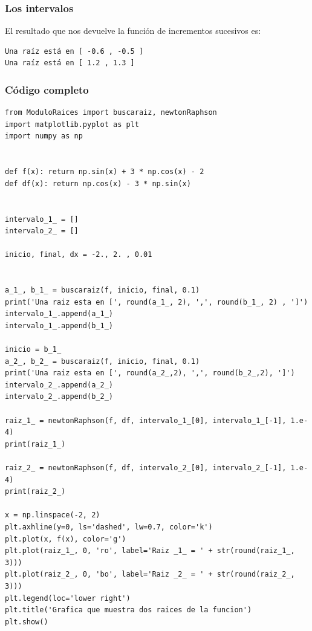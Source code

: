 \begin{frame}[fragile]
\frametitle{Los intervalos}
El resultado que nos devuelve la función de incrementos sucesivos es:
\begin{verbatim}
Una raíz está en [ -0.6 , -0.5 ]
Una raíz está en [ 1.2 , 1.3 ]
\end{verbatim}
\end{frame}
\begin{frame}
\frametitle{Código completo}
\begin{lstlisting}[caption=Intervalos para las raíces, style=FormattedNumber, basicstyle=\linespread{1.1}\ttfamily=\small, columns=fullflexible]
from ModuloRaices import buscaraiz, newtonRaphson
import matplotlib.pyplot as plt
import numpy as np


def f(x): return np.sin(x) + 3 * np.cos(x) - 2
def df(x): return np.cos(x) - 3 * np.sin(x)


intervalo_1_ = []
intervalo_2_ = []

inicio, final, dx = -2., 2. , 0.01


a_1_, b_1_ = buscaraiz(f, inicio, final, 0.1)
print('Una raiz esta en [', round(a_1_, 2), ',', round(b_1_, 2) , ']')
intervalo_1_.append(a_1_)
intervalo_1_.append(b_1_)

inicio = b_1_
a_2_, b_2_ = buscaraiz(f, inicio, final, 0.1)
print('Una raiz esta en [', round(a_2_,2), ',', round(b_2_,2), ']')
intervalo_2_.append(a_2_)
intervalo_2_.append(b_2_)

raiz_1_ = newtonRaphson(f, df, intervalo_1_[0], intervalo_1_[-1], 1.e-4)
print(raiz_1_)

raiz_2_ = newtonRaphson(f, df, intervalo_2_[0], intervalo_2_[-1], 1.e-4)
print(raiz_2_)

x = np.linspace(-2, 2)
plt.axhline(y=0, ls='dashed', lw=0.7, color='k')
plt.plot(x, f(x), color='g')
plt.plot(raiz_1_, 0, 'ro', label='Raiz _1_ = ' + str(round(raiz_1_, 3)))
plt.plot(raiz_2_, 0, 'bo', label='Raiz _2_ = ' + str(round(raiz_2_, 3)))
plt.legend(loc='lower right')
plt.title('Grafica que muestra dos raices de la funcion')
plt.show()
\end{lstlisting}    
\end{frame}
